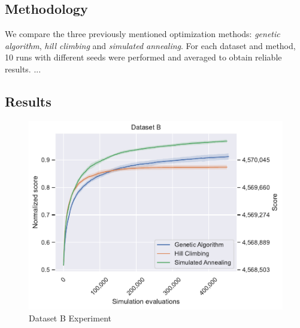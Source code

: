 \subsection*{Methodology}

We compare the three previously mentioned optimization methods: \textit{genetic algorithm}, \textit{hill climbing} and \textit{simulated annealing}. For each dataset and method, 10 runs with different seeds were performed and averaged to obtain reliable results. ...

\subsection*{Results}

\begin{figure}
    \centering
    \includegraphics[width=\linewidth]{img/experiments/b_Genetic Algorithm_Hill Climbing_Simulated Annealing.pdf}
    \caption[Dataset B Experiment]{
        Dataset B Experiment
    }
    \label{fig:dataset_b_experiment}
\end{figure}

